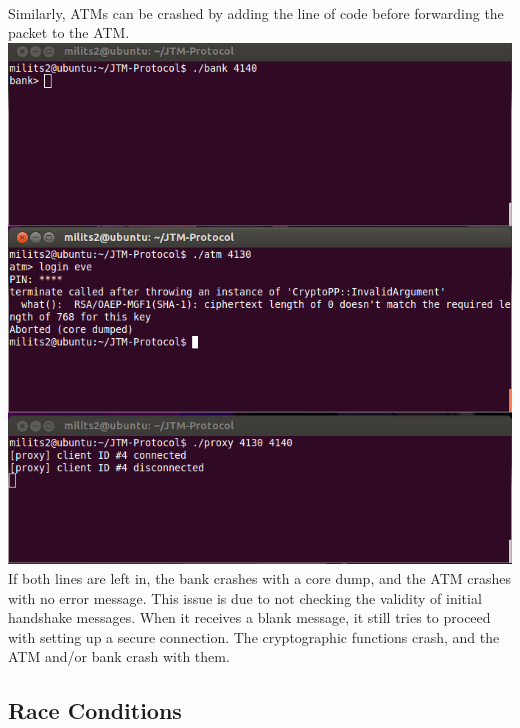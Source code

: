 \documentclass{article}
\begin{document}
\\
Similarly, ATMs can be crashed by adding the line of code before forwarding the packet to the ATM.
\\
\includegraphics[scale=0.5]{crashATM.png}
\\
If both lines are left in, the bank crashes with a core dump, and the ATM crashes with no error message. This issue is due to not checking the validity of initial handshake messages. When it receives a blank message, it still tries to proceed with setting up a secure connection. The cryptographic functions crash, and the ATM and/or bank crash with them.

\subsection{Race Conditions}
\end{document}

